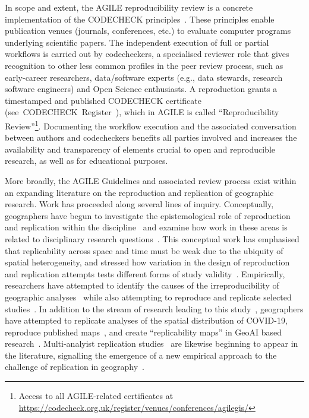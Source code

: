 \documentclass{josis}
\begin{document}
In scope and extent, the AGILE reproducibility review is a concrete implementation of the CODECHECK principles~\cite{nust_codecheck_2021}.
These principles enable publication venues (journals, conferences, etc.) to evaluate computer programs underlying scientific papers.
The independent execution of full or partial workflows is carried out by codecheckers, a specialised reviewer role that gives recognition to other  less common profiles in the peer review process, such as early-career researchers, data/software experts (e.g., data stewards, research software engineers) and Open Science enthusiasts. A reproduction grants a timestamped and published CODECHECK certificate (see~CODECHECK~Register~\cite{nust_codecheckersregister_2025}), which in AGILE is called ``Reproducibility Review''\footnote{Access to all AGILE-related certificates at \url{https://codecheck.org.uk/register/venues/conferences/agilegis/}}.
Documenting the workflow execution and the associated conversation between authors and codecheckers benefits all parties involved and increases the availability and transparency of elements crucial to open and reproducible research, as well as for educational purposes.

More broadly, the AGILE Guidelines and associated review process exist within an expanding literature on the reproduction and replication of geographic research. 
Work has proceeded along several lines of inquiry. 
Conceptually, geographers have begun to investigate the epistemological role of reproduction and replication within the discipline~\cite{goodchild2021,kedron_geoganaly_2021, kedron_reproducibility_2021} and examine how work in these areas is related to disciplinary research questions~\cite{Wainwright2021, Sui2021, Brunsdon2021, kedron2022}. 
This conceptual work has emphasised that replicability across space and time must be weak due to the ubiquity of spatial heterogeneity, and stressed how variation in the design of reproduction and replication attempts tests different forms of study validity~\cite{kedron2024, kedron2025}. 
Empirically, researchers have attempted to identify the causes of the irreproducibility of geographic analyses~\cite{kedron2024_insights, kedron2025} while also attempting to reproduce and replicate selected studies~\cite{kedron2022_dimaggio, Li2024_geoAI}. 
In addition to the stream of research leading to this study~\cite{nust2018, ostermann2021}, geographers have attempted to replicate analyses of the spatial distribution of COVID-19\cite{paez2022, kedron2024}, reproduce published maps~\cite{koukouraki_map_2023, Koukouraki2024}, and create ``replicability maps'' in GeoAI based research~\cite{Li2024_geoAI}. 
Multi-analyist replication studies~\cite{Aczel2021} are likewise beginning to appear in the literature, signalling the emergence of a new empirical approach to the challenge of replication in geography~\cite{breznau2025}. 
\end{document}
